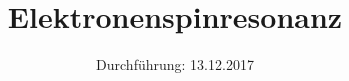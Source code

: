 

\subject{V28}
\title{Elektronenspinresonanz}
\date{
  Durchführung: 13.12.2017
  \hspace{3em}
}



\maketitle
\thispagestyle{empty}
\tableofcontents
\newpage







\nocite{*}
\printbibliography

%
%
%
%
%


